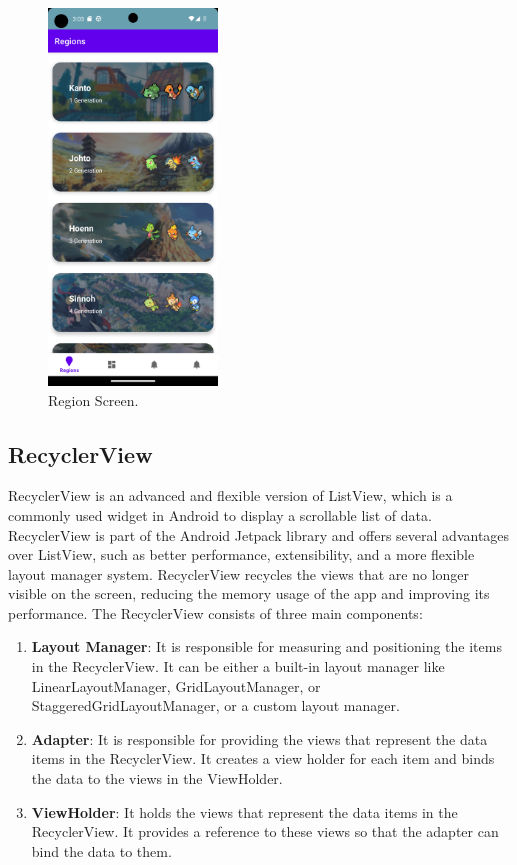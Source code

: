 \documentclass[a4paper, 12pt]{article}
\begin{document}
\begin{figure}
	\centering
	\includegraphics[height=10cm]{imgs/region_screen.png}
	\caption{Region Screen.}
	\label{fig:screen_region}
\end{figure}

\subsection{RecyclerView}

RecyclerView is an advanced and flexible version of ListView, which is a commonly used widget in Android to display a scrollable list of data. RecyclerView 
is part of the Android Jetpack library and offers several advantages over ListView, such as better performance, extensibility, 
and a more flexible layout manager system. RecyclerView recycles the views that are no longer visible on the screen, 
reducing the memory usage of the app and improving its performance.
The RecyclerView consists of three main components:
\begin{enumerate}
    \item \textbf{Layout Manager}: It is responsible for measuring and positioning the items in the RecyclerView. It can be either a built-in layout manager like LinearLayoutManager, GridLayoutManager, or StaggeredGridLayoutManager, or a custom layout manager.
    \item \textbf{Adapter}: It is responsible for providing the views that represent the data items in the RecyclerView. It creates a view holder for each item and binds the data to the views in the ViewHolder.
    \item \textbf{ViewHolder}: It holds the views that represent the data items in the RecyclerView. It provides a reference to these views so that the adapter can bind the data to them.
\end{enumerate}
\end{document}
